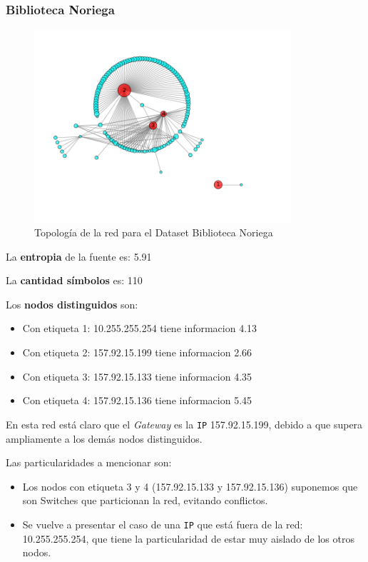 \subsubsection{Biblioteca Noriega}

\begin{figure}[H]
    \centering
    \includegraphics[width=0.85\textwidth]{imagenes/noriega.png}
    \caption{Topología de la red para el Dataset Biblioteca Noriega}
\end{figure}

La \textbf{entropia} de la fuente es: 5.91

La \textbf{cantidad símbolos} es: 110

Los \textbf{nodos distinguidos} son:

\begin{itemize}
    \item Con etiqueta 1: 10.255.255.254 tiene informacion 4.13
    \item Con etiqueta 2: 157.92.15.199 tiene informacion 2.66
    \item Con etiqueta 3: 157.92.15.133 tiene informacion 4.35
    \item Con etiqueta 4: 157.92.15.136 tiene informacion 5.45
\end{itemize}

En esta red está claro que el \textit{Gateway} es la \texttt{IP} 157.92.15.199, debido a que
supera ampliamente a los demás nodos distinguidos.

Las particularidades a mencionar son:
\begin{itemize}
    \item Los nodos con etiqueta 3 y 4 (157.92.15.133 y 157.92.15.136) suponemos
        que son Switches que particionan la red, evitando conflictos.
    \item  Se vuelve a presentar el caso de una \texttt{IP} que está fuera de la red: 10.255.255.254, que tiene la particularidad de estar muy aislado de los otros nodos.
\end{itemize}



